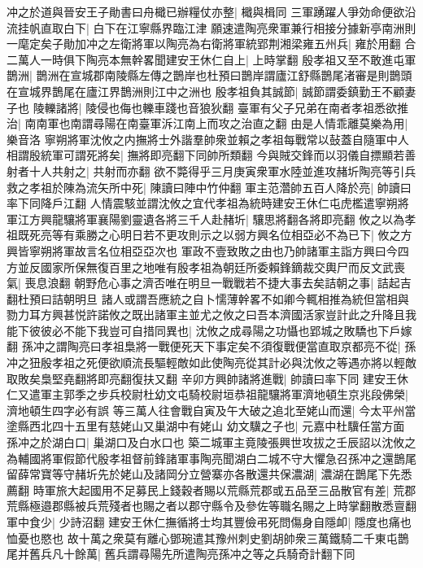 冲之於道與晉安王子勛書曰舟檝已辦糧仗亦整|{
	檝與楫同}
三軍踴躍人爭効命便欲沿流挂帆直取白下|{
	白下在江寧縣界臨江津}
願速遣陶亮衆軍兼行相接分據新亭南洲則一麾定矣子勛加冲之左衛將軍以陶亮為右衛將軍統郢荆湘梁雍五州兵|{
	雍於用翻}
合二萬人一時俱下陶亮本無幹畧聞建安王休仁自上|{
	上時掌翻}
殷孝祖又至不敢進屯軍鵲洲|{
	鵲洲在宣城郡南陵縣左傳之鵲岸也杜預曰鵲岸謂廬江舒縣鵲尾渚審是則鵲頭在宣城界鵲尾在廬江界鵲洲則江中之洲也}
殷孝祖負其誠節|{
	誠節謂委鎮勤王不顧妻子也}
陵轢諸將|{
	陵侵也侮也轢車踐也音狼狄翻}
臺軍有父子兄弟在南者孝祖悉欲推治|{
	南南軍也南謂尋陽在南臺軍泝江南上而攻之治直之翻}
由是人情乖離莫樂為用|{
	樂音洛}
寧朔將軍沈攸之内撫將士外諧羣帥衆並賴之孝祖每戰常以鼔蓋自隨軍中人相謂殷統軍可謂死將矣|{
	撫將即亮翻下同帥所類翻}
今與賊交鋒而以羽儀自摽顯若善射者十人共射之|{
	共射而亦翻}
欲不斃得乎三月庚寅衆軍水陸並進攻赭圻陶亮等引兵救之孝祖於陳為流矢所中死|{
	陳讀曰陣中竹仲翻}
軍主范濳帥五百人降於亮|{
	帥讀曰率下同降戶江翻}
人情震駭並謂沈攸之宜代孝祖為統時建安王休仁屯虎檻遣寧朔將軍江方興龍驤將軍襄陽劉靈遺各將三千人赴赭圻|{
	驤思將翻各將即亮翻}
攸之以為孝祖既死亮等有乘勝之心明日若不更攻則示之以弱方興名位相亞必不為已下|{
	攸之方興皆寧朔將軍故言名位相亞亞次也}
軍政不壹致敗之由也乃帥諸軍主詣方興曰今四方並反國家所保無復百里之地唯有殷孝祖為朝廷所委賴鋒鏑裁交輿尸而反文武喪氣|{
	喪息浪翻}
朝野危心事之濟否唯在明旦一戰戰若不捷大事去矣詰朝之事|{
	詰起吉翻杜預曰詰朝明旦}
諸人或謂吾應統之自卜懦薄幹畧不如卿今輒相推為統但當相與勠力耳方興甚悦許諾攸之既出諸軍主並尤之攸之曰吾本濟國活家豈計此之升降且我能下彼彼必不能下我豈可自措同異也|{
	沈攸之成尋陽之功懾也郢城之敗驕也下戶嫁翻}
孫冲之謂陶亮曰孝祖梟將一戰便死天下事定矣不須復戰便當直取京都亮不從|{
	孫冲之狃殷孝祖之死便欲順流長驅輕敵如此使陶亮從其計必與沈攸之等遇亦將以輕敵取敗矣梟堅堯翻將即亮翻復扶又翻}
辛卯方興帥諸將進戰|{
	帥讀曰率下同}
建安王休仁又遣軍主郭季之步兵校尉杜幼文屯騎校尉垣恭祖龍驤將軍濟地頓生京兆段佛榮|{
	濟地頓生四字必有誤}
等三萬人往會戰自寅及午大破之追北至姥山而還|{
	今太平州當塗縣西北四十五里有慈姥山又巢湖中有姥山}
幼文驥之子也|{
	元嘉中杜驥任當方面}
孫冲之於湖白口|{
	巢湖口及白水口也}
築二城軍主竟陵張興世攻拔之壬辰詔以沈攸之為輔國將軍假節代殷孝祖督前鋒諸軍事陶亮聞湖白二城不守大懼急召孫冲之還鵲尾留薛常寶等守赭圻先於姥山及諸岡分立營寨亦各散還共保濃湖|{
	濃湖在鵲尾下先悉薦翻}
時軍旅大起國用不足募民上錢穀者賜以荒縣荒郡或五品至三品散官有差|{
	荒郡荒縣極邉郡縣被兵荒殘者也賜之者以郡守縣令及參佐等職名賜之上時掌翻散悉亶翻}
軍中食少|{
	少詩沼翻}
建安王休仁撫循將士均其豐儉弔死問傷身自隱卹|{
	隱度也痛也恤憂也愍也}
故十萬之衆莫有離心鄧琬遣其豫州刺史劉胡帥衆三萬鐵騎二千東屯鵲尾并舊兵凡十餘萬|{
	舊兵謂尋陽先所遣陶亮孫冲之等之兵騎奇計翻下同}
